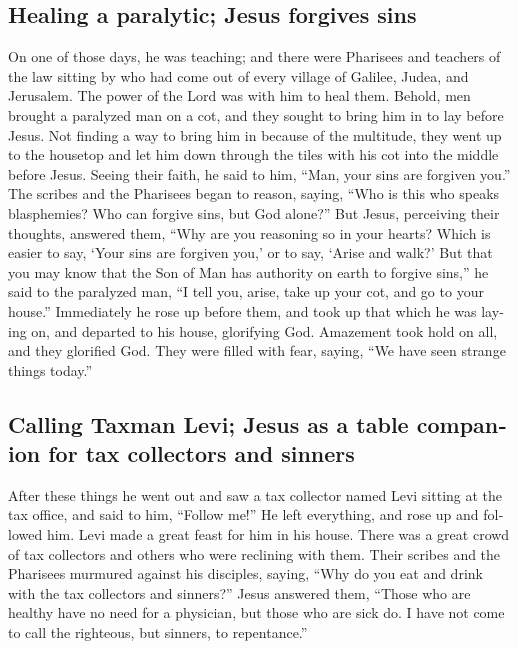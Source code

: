 \begin{paracol}{2}
\begin{otherlanguage}{english}
\hypertarget{healing-a-paralytic-jesus-forgives-sins}{%
\subsection{Healing a paralytic; Jesus forgives
sins}\label{healing-a-paralytic-jesus-forgives-sins}}

 On one of those days, he was teaching; and there were
Pharisees and teachers of the law sitting by who had come out of every
village of Galilee, Judea, and Jerusalem. The power of the Lord was with
him to heal them.  Behold, men brought a paralyzed man on
a cot, and they sought to bring him in to lay before Jesus.
 Not finding a way to bring him in because of the
multitude, they went up to the housetop and let him down through the
tiles with his cot into the middle before Jesus.  Seeing
their faith, he said to him, ``Man, your sins are forgiven you.''
 The scribes and the Pharisees began to reason, saying,
``Who is this who speaks blasphemies? Who can forgive sins, but God
alone?''  But Jesus, perceiving their thoughts, answered
them, ``Why are you reasoning so in your hearts?  Which
is easier to say, `Your sins are forgiven you,' or to say, `Arise and
walk?'  But that you may know that the Son of Man has
authority on earth to forgive sins,'' he said to the paralyzed man, ``I
tell you, arise, take up your cot, and go to your house.''
 Immediately he rose up before them, and took up that
which he was laying on, and departed to his house, glorifying God.
 Amazement took hold on all, and they glorified God. They
were filled with fear, saying, ``We have seen strange things today.''

\hypertarget{calling-taxman-levi-jesus-as-a-table-companion-for-tax-collectors-and-sinners}{%
\subsection{Calling Taxman Levi; Jesus as a table companion for tax
collectors and
sinners}\label{calling-taxman-levi-jesus-as-a-table-companion-for-tax-collectors-and-sinners}}

 After these things he went out and saw a tax collector
named Levi sitting at the tax office, and said to him, ``Follow me!''
 He left everything, and rose up and followed him.
 Levi made a great feast for him in his house. There was
a great crowd of tax collectors and others who were reclining with them.
 Their scribes and the Pharisees murmured against his
disciples, saying, ``Why do you eat and drink with the tax collectors
and sinners?''  Jesus answered them, ``Those who are
healthy have no need for a physician, but those who are sick do.
 I have not come to call the righteous, but sinners, to
repentance.''


\end{otherlanguage}
\end{paracol}
